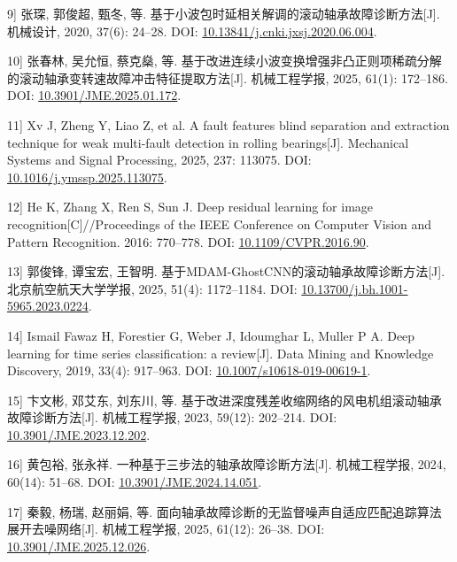 \documentclass[UTF8,12pt,openany,twoside]{ctexbook}
\numberwithin{equation}{chapter}
\begin{document}
\noindent\begingroup\samepage {[}9{]} 张琛, 郭俊超, 甄冬, 等. 基于小波包时延相关解调的滚动轴承故障诊断方法[J]. 机械设计, 2020, 37(6): 24--28. DOI: \url{10.13841/j.cnki.jxsj.2020.06.004}.\par\endgroup

\noindent\begingroup\samepage {[}10{]} 张春林, 吴允恒, 蔡克燊, 等. 基于改进连续小波变换增强非凸正则项稀疏分解的滚动轴承变转速故障冲击特征提取方法[J]. 机械工程学报, 2025, 61(1): 172--186. DOI: \url{10.3901/JME.2025.01.172}.\par\endgroup

\noindent\begingroup\samepage {[}11{]} Xv J, Zheng Y, Liao Z, et al. A fault features blind separation and extraction technique for weak multi-fault detection in rolling bearings[J]. Mechanical Systems and Signal Processing, 2025, 237: 113075. DOI: \url{10.1016/j.ymssp.2025.113075}.\par\endgroup

\noindent\begingroup\samepage {[}12{]} He K, Zhang X, Ren S, Sun J. Deep residual learning for image recognition[C]//Proceedings of the IEEE Conference on Computer Vision and Pattern Recognition. 2016: 770--778. DOI: \url{10.1109/CVPR.2016.90}.\par\endgroup

\noindent\begingroup\samepage {[}13{]} 郭俊锋, 谭宝宏, 王智明. 基于MDAM-GhostCNN的滚动轴承故障诊断方法[J]. 北京航空航天大学学报, 2025, 51(4): 1172--1184. DOI: \url{10.13700/j.bh.1001-5965.2023.0224}.\par\endgroup

\noindent\begingroup\samepage {[}14{]} Ismail Fawaz H, Forestier G, Weber J, Idoumghar L, Muller P A. Deep learning for time series classification: a review[J]. Data Mining and Knowledge Discovery, 2019, 33(4): 917--963. DOI: \url{10.1007/s10618-019-00619-1}.\par\endgroup

\noindent\begingroup\samepage {[}15{]} 卞文彬, 邓艾东, 刘东川, 等. 基于改进深度残差收缩网络的风电机组滚动轴承故障诊断方法[J]. 机械工程学报, 2023, 59(12): 202--214. DOI: \url{10.3901/JME.2023.12.202}.\par\endgroup

\noindent\begingroup\samepage {[}16{]} 黄包裕, 张永祥. 一种基于三步法的轴承故障诊断方法[J]. 机械工程学报, 2024, 60(14): 51--68. DOI: \url{10.3901/JME.2024.14.051}.\par\endgroup

\noindent\begingroup\samepage {[}17{]} 秦毅, 杨瑞, 赵丽娟, 等. 面向轴承故障诊断的无监督噪声自适应匹配追踪算法展开去噪网络[J]. 机械工程学报, 2025, 61(12): 26--38. DOI: \url{10.3901/JME.2025.12.026}.\par\endgroup
\end{document}
